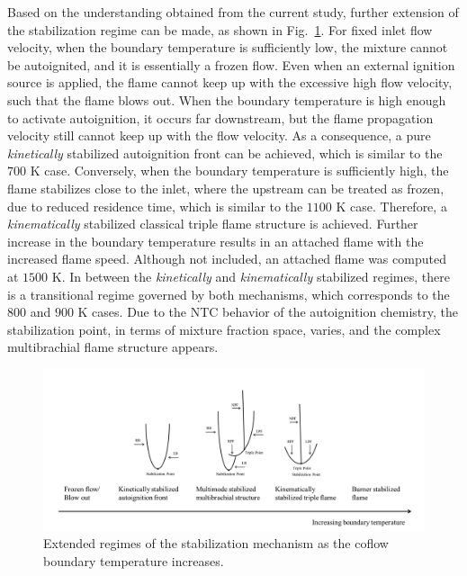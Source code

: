 Based on the understanding obtained from the current study, further extension of the stabilization regime can be made, as shown in Fig.~\ref{fig:regime_T}.  For fixed inlet flow velocity, when the boundary temperature is sufficiently low, the mixture cannot be autoignited, and it is essentially a frozen flow.  Even when an external ignition source is applied, the flame cannot keep up with the excessive high flow velocity, such that the flame blows out.  When the boundary temperature is high enough to activate autoignition, it occurs far downstream, but the flame propagation velocity still cannot keep up with the flow velocity.  As a consequence, a pure \emph {kinetically} stabilized autoignition front can be achieved, which is similar to the $700$ K case.  Conversely, when the boundary temperature is sufficiently high, the flame stabilizes close to the inlet, where the upstream can be treated as frozen, due to reduced residence time, which is similar to the $1100$ K case.  Therefore, a \emph {kinematically} stabilized classical triple flame structure is achieved.  Further increase in the boundary temperature results in an attached flame with the increased flame speed.  Although not included, an attached flame was computed at $1500$ K.  In between the \emph {kinetically} and \emph {kinematically} stabilized regimes, there is a transitional regime governed by both mechanisms, which corresponds to the $800$ and $900$ K cases.  Due to the NTC behavior of the autoignition chemistry, the stabilization point, in terms of mixture fraction space, varies, and the complex multibrachial flame structure appears.  

\begin{figure}[t]
  \centering
  \scriptsize
  \includegraphics[width=1.0\textwidth]{ch-dynamics/regime.png}
  \normalsize
  \caption{Extended regimes of the stabilization mechanism as the coflow boundary temperature increases.}
  \label{fig:regime_T}
\end{figure}

